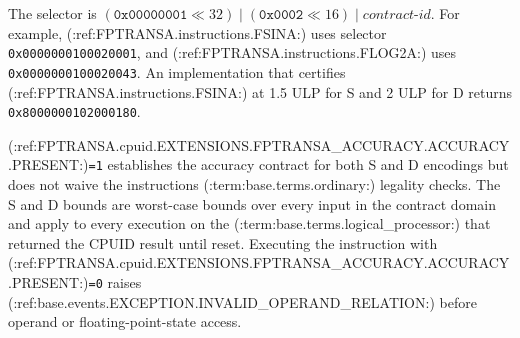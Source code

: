 The selector is $(\texttt{0x00000001} \ll 32) \mathbin{|} (\texttt{0x0002} \ll 16) \mathbin{|}
\textit{contract-id}$. For example, (:ref:FPTRANSA.instructions.FSINA:) uses selector \texttt{0x0000000100020001}, and
(:ref:FPTRANSA.instructions.FLOG2A:) uses \texttt{0x0000000100020043}. An implementation that certifies (:ref:FPTRANSA.instructions.FSINA:) at 1.5 ULP for
S and 2 ULP for D returns \texttt{0x8000000102000180}.

(:ref:FPTRANSA.cpuid.EXTENSIONS.FPTRANSA_ACCURACY.ACCURACY.PRESENT:)\texttt{=1} establishes the accuracy contract for both S and D encodings but does not waive the
instruction\textquotesingle{}s (:term:base.terms.ordinary:) legality checks. The S and D bounds are worst-case bounds over every input in
the contract domain and apply to every execution on the (:term:base.terms.logical_processor:) that returned the CPUID result until reset.
Executing the instruction with (:ref:FPTRANSA.cpuid.EXTENSIONS.FPTRANSA_ACCURACY.ACCURACY.PRESENT:)\texttt{=0} raises (:ref:base.events.EXCEPTION.INVALID_OPERAND_RELATION:)
before operand or floating-point-state access.



